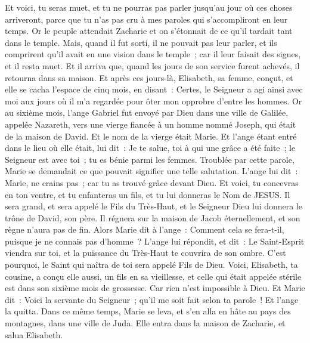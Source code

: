 \begin{multicols}{2}
Et voici, tu seras muet, et tu ne pourras pas parler jusqu'au jour où ces choses arriveront, parce que tu n'as pas cru à mes paroles qui s'accompliront en leur temps.
Or le peuple attendait Zacharie et on s'étonnait de ce qu'il tardait tant dans le temple.
Mais, quand il fut sorti, il ne pouvait pas leur parler, et ils comprirent qu'il avait eu une vision dans le temple~; car il leur faisait des signes, et il resta muet.
Et il arriva que, quand les jours de son service furent achevés, il retourna dans sa maison.
Et après ces jours-là, Elisabeth, sa femme, conçut, et elle se cacha l'espace de cinq mois, en disant~:
Certes, le Seigneur a agi ainsi avec moi aux jours où il m'a regardée pour ôter mon opprobre d'entre les hommes.
Or au sixième mois, l'ange Gabriel fut envoyé par Dieu dans une ville de Galilée, appelée Nazareth,
vers une vierge fiancée à un homme nommé Joseph, qui était de la maison de David. Et le nom de la vierge était Marie.
Et l'ange étant entré dans le lieu où elle était, lui dit~: Je te salue, toi à qui une grâce a été faite~; le Seigneur est avec toi~; tu es bénie parmi les femmes.
Troublée par cette parole, Marie se demandait ce que pouvait signifier une telle salutation.
L'ange lui dit~: Marie, ne crains pas~; car tu as trouvé grâce devant Dieu.
Et voici, tu concevras en ton ventre, et tu enfanteras un fils, et tu lui donneras le Nom de JESUS.
Il sera grand, et sera appelé le Fils du Très-Haut, et le Seigneur Dieu lui donnera le trône de David, son père.
Il régnera sur la maison de Jacob éternellement, et son règne n'aura pas de fin.
Alors Marie dit à l'ange~: Comment cela se fera-t-il, puisque je ne connais pas d'homme~?
L'ange lui répondit, et dit~: Le Saint-Esprit viendra sur toi, et la puissance du Très-Haut te couvrira de son ombre. C'est pourquoi, le Saint qui naîtra de toi sera appelé Fils de Dieu.
Voici, Elisabeth, ta cousine, a conçu elle aussi, un fils en sa vieillesse, et celle qui était appelée stérile est dans son sixième mois de grossesse.
Car rien n'est impossible à Dieu.
Et Marie dit~: Voici la servante du Seigneur~; qu'il me soit fait selon ta parole~! Et l'ange la quitta.
Dans ce même temps, Marie se leva, et s'en alla en hâte au pays des montagnes, dans une ville de Juda.
Elle entra dans la maison de Zacharie, et salua Elisabeth.

\end{multicols}
